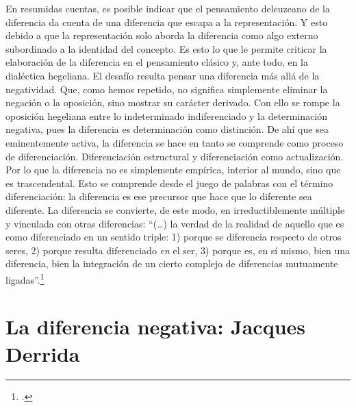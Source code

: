 \documentclass{book}
\begin{document}
En resumidas cuentas, es posible indicar que el pensamiento deleuzeano
de la diferencia da cuenta de una diferencia que escapa a la
representación. Y esto debido a que la representación solo aborda la
diferencia como algo externo subordinado a la identidad del concepto. Es
esto lo que le permite criticar la elaboración de la diferencia en el
pensamiento clásico y, ante todo, en la dialéctica hegeliana. El desafío
resulta pensar una diferencia más allá de la negatividad. Que, como
hemos repetido, no significa simplemente eliminar la negación o la
oposición, sino mostrar su carácter derivado. Con ello se rompe la
oposición hegeliana entre lo indeterminado indiferenciado y la
determinación negativa, pues la diferencia es determinación como
distinción. De ahí que sea eminentemente activa, la diferencia se hace
en tanto se comprende como proceso de diferenciación. Diferenciación
estructural y diferenciación como actualización. Por lo que la
diferencia no es simplemente empírica, interior al mundo, sino que es
trascendental. Esto se comprende desde el juego de palabras con el
término diferenciación: la diferencia es ese precursor que hace que lo
diferente sea diferente. La diferencia se convierte, de este modo, en
irreductiblemente múltiple y vinculada con otras diferencias:
\enquote{(\dots) la verdad de la realidad de aquello que es como
diferenciado en un sentido triple: 1) porque se diferencia respecto de
otros seres, 2) porque resulta diferenciado \emph{en} el ser, 3) porque
es, en sí mismo, bien una diferencia, bien la integración de un cierto
complejo de diferencias mutuamente ligadas}.\footcite[17]{gallego2008}

\section{La diferencia negativa: Jacques Derrida}
\end{document}
